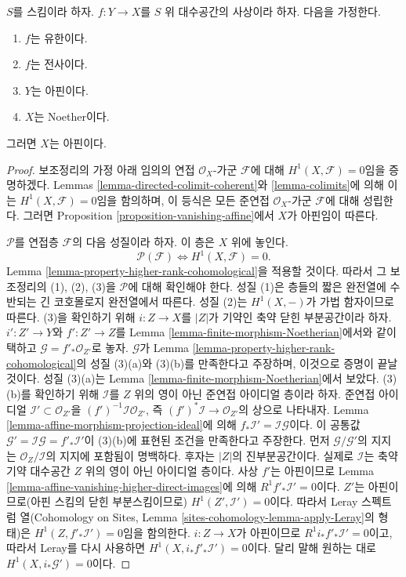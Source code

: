 \begin{lemma}
\label{lemma-image-affine-finite-morphism-affine-Noetherian}
$S$를 스킴이라 하자. $f : Y \to X$를 $S$ 위 대수공간의 사상이라 하자.
다음을 가정한다.
\begin{enumerate}
\item $f$는 유한이다.
\item $f$는 전사이다.
\item $Y$는 아핀이다.
\item $X$는 Noether이다.
\end{enumerate}
그러면 $X$는 아핀이다.
\end{lemma}

\begin{proof}
보조정리의 가정 아래 임의의 연접 $\mathcal{O}_X$-가군
$\mathcal{F}$에 대해 $H^1(X, \mathcal{F}) = 0$임을 증명하겠다.
Lemmas \ref{lemma-directed-colimit-coherent}와
\ref{lemma-colimits}에 의해 이는 $H^1(X, \mathcal{F}) = 0$임을 함의하며,
이 등식은 모든 준연접 $\mathcal{O}_X$-가군 $\mathcal{F}$에 대해 성립한다. 그러면
Proposition \ref{proposition-vanishing-affine}에서 $X$가 아핀임이 따른다.

\medskip\noindent
$\mathcal{P}$를 연접층 $\mathcal{F}$의 다음 성질이라 하자. 이 층은 $X$ 위에 놓인다.
$$
\mathcal{P}(\mathcal{F}) \Leftrightarrow H^1(X, \mathcal{F}) = 0.
$$
Lemma \ref{lemma-property-higher-rank-cohomological}을 적용할 것이다.
따라서 그 보조정리의 (1), (2), (3)을 $\mathcal{P}$에 대해 확인해야 한다.
성질 (1)은 층들의 짧은 완전열에 수반되는 긴 코호몰로지 완전열에서
따른다. 성질 (2)는 $H^1(X, -)$가 가법 함자이므로 따른다. (3)을
확인하기 위해 $i : Z \to X$를 $|Z|$가 기약인 축약 닫힌 부분공간이라
하자. $i' : Z' \to Y$와 $f' : Z' \to Z$를 Lemma
\ref{lemma-finite-morphism-Noetherian}에서와 같이 택하고
$\mathcal{G} = f'_*\mathcal{O}_{Z'}$로 놓자. $\mathcal{G}$가 Lemma
\ref{lemma-property-higher-rank-cohomological}의 성질 (3)(a)와 (3)(b)를
만족한다고 주장하며, 이것으로 증명이 끝날 것이다. 성질 (3)(a)는
Lemma \ref{lemma-finite-morphism-Noetherian}에서 보았다. (3)(b)를
확인하기 위해 $\mathcal{I}$를 $Z$ 위의 영이 아닌 준연접 아이디얼
층이라 하자.
준연접 아이디얼
$\mathcal{I}' \subset \mathcal{O}_{Z'}$을
$(f')^{-1}\mathcal{I} \mathcal{O}_{Z'}$, 즉
$(f')^*\mathcal{I} \to \mathcal{O}_{Z'}$의 상으로 나타내자.
Lemma \ref{lemma-affine-morphism-projection-ideal}에 의해
$f_*\mathcal{I}' = \mathcal{I} \mathcal{G}$이다. 이 공통값
$\mathcal{G}' = \mathcal{I} \mathcal{G} = f'_*\mathcal{I}'$이 (3)(b)에
표현된 조건을 만족한다고 주장한다. 먼저
$\mathcal{G}/\mathcal{G}'$의 지지는 $\mathcal{O}_Z/\mathcal{I}$의
지지에 포함됨이 명백하다. 후자는 $|Z|$의 진부분공간이다. 실제로
$\mathcal{I}$는 축약 기약 대수공간 $Z$ 위의 영이 아닌 아이디얼 층이다.
사상 $f'$는 아핀이므로 Lemma
\ref{lemma-affine-vanishing-higher-direct-images}에 의해
$R^1f'_*\mathcal{I}' = 0$이다. $Z'$는 아핀이므로(아핀 스킴의 닫힌
부분스킴이므로) $H^1(Z', \mathcal{I}') = 0$이다. 따라서 Leray
스펙트럼 열(Cohomology on Sites, Lemma
\ref{sites-cohomology-lemma-apply-Leray}의 형태)은
$H^1(Z, f'_*\mathcal{I}') = 0$임을 함의한다.
$i : Z \to X$가 아핀이므로 $R^1i_*f'_*\mathcal{I}' = 0$이고, 따라서
Leray를 다시 사용하면 $H^1(X, i_*f'_*\mathcal{I}') = 0$이다.
달리 말해 원하는 대로 $H^1(X, i_*\mathcal{G}') = 0$이다.
\end{proof}
